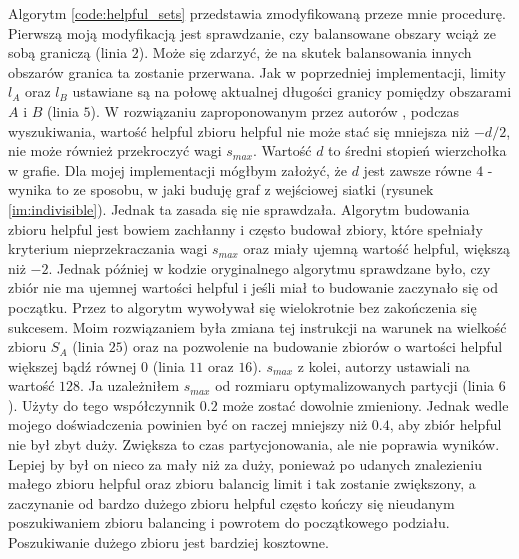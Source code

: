 Algorytm \ref{code:helpful_sets} przedstawia zmodyfikowaną przeze mnie procedurę.
Pierwszą moją modyfikacją jest sprawdzanie, czy balansowane obszary wciąż ze sobą graniczą (linia $2$).
Może się zdarzyć, że na skutek balansowania innych obszarów granica ta zostanie przerwana.
Jak w poprzedniej implementacji, limity $l_A$ oraz $l_B$ ustawiane są na połowę aktualnej długości granicy pomiędzy
obszarami $A$ i $B$ (linia $5$).
W rozwiązaniu zaproponowanym przez autorów \cite{1364754}, podczas wyszukiwania, wartość helpful zbioru helpful nie może stać się mniejsza
niż $-d/2$, nie może również przekroczyć wagi $s_{max}$.
Wartość $d$ to średni stopień wierzchołka w grafie.
Dla mojej implementacji mógłbym założyć, że $d$ jest zawsze równe $4$ - wynika to ze sposobu, w jaki buduję
graf z wejściowej siatki (rysunek \ref{im:indivisible}).
Jednak ta zasada się nie sprawdzała.
Algorytm budowania zbioru helpful jest bowiem zachłanny i często budował zbiory, które spełniały kryterium nieprzekraczania
wagi $s_{max}$ oraz miały ujemną wartość helpful, większą niż $-2$.
Jednak później w kodzie oryginalnego algorytmu sprawdzane było, czy zbiór nie ma ujemnej wartości helpful i
jeśli miał to budowanie zaczynało się od początku.
Przez to algorytm wywoływał się wielokrotnie bez zakończenia się sukcesem.
Moim rozwiązaniem była zmiana tej instrukcji na warunek na wielkość zbioru $S_A$ (linia $25$) oraz na
pozwolenie na budowanie zbiorów o wartości helpful większej bądź równej $0$ (linia $11$ oraz $16$).
$s_{max}$ z kolei, autorzy \cite{article} ustawiali na wartość $128$.
Ja uzależniłem $s_{max}$ od rozmiaru optymalizowanych partycji (linia $6$).
Użyty do tego współczynnik $0.2$ może zostać dowolnie zmieniony.
Jednak wedle mojego doświadczenia powinien być on raczej mniejszy niż $0.4$, aby zbiór helpful nie był zbyt duży.
Zwiększa to czas partycjonowania, ale nie poprawia wyników.
Lepiej by był on nieco za mały niż za duży, ponieważ po udanych znalezieniu małego zbioru helpful oraz zbioru balancig
limit i tak zostanie zwiększony, a zaczynanie od bardzo dużego zbioru helpful często kończy się nieudanym poszukiwaniem
zbioru balancing i powrotem do początkowego podziału.
Poszukiwanie dużego zbioru jest bardziej kosztowne.

